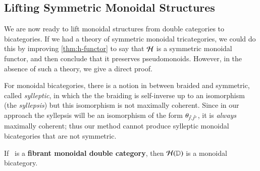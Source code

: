\subsection{Lifting Symmetric Monoidal Structures}
We are now ready to lift monoidal structures from double categories to
bicategories.  If we had a theory of symmetric monoidal tricategories,
we could do this by improving \autoref{thm:h-functor} to say that
$\mathcal{H}$ is a symmetric monoidal functor, and then conclude that it
preserves pseudomonoids.  However, in the absence of such a theory, we
give a direct proof.

\begin{rmk}\label{rmk:sym}
  For monoidal bicategories, there is a notion in between braided and
  symmetric, called \emph{sylleptic}, in which the the braiding is
  self-inverse up to an isomorphism (the \emph{syllepsis}) but this
  isomorphism is not maximally coherent.  Since in our approach the
  syllepsis will be an isomorphism of the form
  $\theta_{\hat{f},\hat{f}'}$, it is \emph{always} maximally coherent;
  thus our method cannot produce sylleptic monoidal bicategories that
  are not symmetric.
\end{rmk}

\begin{lem}\label{thm:mon11-monbi}
  If \lD\ is a {\bf fibrant monoidal double category}, then $\mathcal{H}(\mathbb{D})$ is a
  monoidal bicategory.  
\end{lem}


